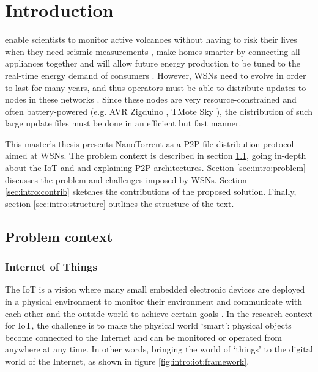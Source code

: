 \chapter{Introduction}
\label{cha:intro}
 enable scientists to monitor active volcanoes without having to risk their lives when they need seismic measurements \cite{reventador}, make homes smarter by connecting all appliances together \cite{chan-smart-home-review} and will allow future energy production to be tuned to the real-time energy demand of consumers \cite{gungor-smart-grid-technologies} \cite{gungor-smart-grid-survey}. However, \glspl{WSN} need to evolve in order to last for many years, and thus operators must be able to distribute updates to nodes in these networks \cite{han-sensor-update-survey} \cite{wang-reprogramming}. Since these nodes are very resource-constrained and often battery-powered (e.g. AVR Zigduino \cite{zigduino-manual}, TMote Sky \cite{tmote-sky-manual}), the distribution of such large update files must be done in an efficient but fast manner.

This master's thesis presents NanoTorrent as a \acrfull{P2P} file distribution protocol aimed at \glspl{WSN}. The problem context is described in section \ref{sec:intro:context}, going in-depth about the \acrlong{IoT} and  and explaining \acrlong{P2P} architectures. Section \ref{sec:intro:problem} discusses the problem and challenges imposed by \glspl{WSN}. Section \ref{sec:intro:contrib} sketches the contributions of the proposed solution. Finally, section \ref{sec:intro:structure} outlines the structure of the text.

\section{Problem context}
\label{sec:intro:context}

\subsection{Internet of Things}
\label{sec:intro:iot}
The \acrfull{IoT} is a vision where many small embedded electronic devices are deployed in a physical environment to monitor their environment and communicate with each other and the outside world to achieve certain goals \cite{iotcluster15}. In the research context for \gls{IoT}, the challenge is to make the physical world `smart': physical objects become connected to the Internet and can be monitored or operated from anywhere at any time. In other words, bringing the world of `things' to the digital world of the Internet, as shown in figure \ref{fig:intro:iot:framework}.

